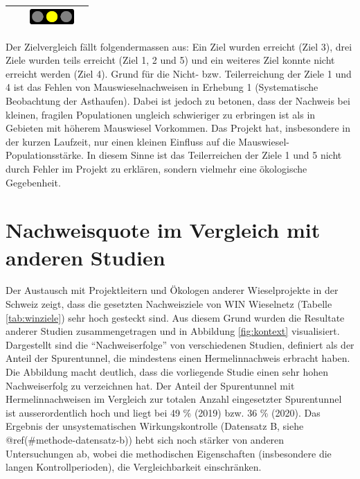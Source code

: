 \documentclass[
  oneside]{scrbook}
\begin{document}
\begin{table}
\begin{tabular}[t]{rp{65mm}>{}lp{60mm}}
\cellcolor{gray!6}{5} & \cellcolor{gray!6}{In jeder untersuchten Verbindungsachse sollen mindestens einmal pro Jahr Wiesel (mindestens Hermeline) nachgewiesen werden.} & \cellcolor{gray!6}{}\includegraphics[width=0.67in, height=0.24in]{images/ampel_gelb.png} & \cellcolor{gray!6}{Gemäss Datensatz A2 konnten auf 4 von 5 kontrollierten Korridoren Nachweise von Hermelin und Iltis gemacht werden}\\
\bottomrule
\end{tabular}
\end{table}

Der Zielvergleich fällt folgendermassen aus: Ein Ziel wurden erreicht (Ziel 3), drei Ziele wurden teils erreicht (Ziel 1, 2 und 5) und ein weiteres Ziel konnte nicht erreicht werden (Ziel 4). Grund für die Nicht- bzw. Teilerreichung der Ziele 1 und 4 ist das Fehlen von Mauswieselnachweisen in Erhebung 1 (Systematische Beobachtung der Asthaufen). Dabei ist jedoch zu betonen, dass der Nachweis bei kleinen, fragilen Populationen ungleich schwieriger zu erbringen ist als in Gebieten mit höherem Mauswiesel Vorkommen. Das Projekt hat, insbesondere in der kurzen Laufzeit, nur einen kleinen Einfluss auf die Mauswiesel-Populationsstärke. In diesem Sinne ist das Teilerreichen der Ziele 1 und 5 nicht durch Fehler im Projekt zu erklären, sondern vielmehr eine ökologische Gegebenheit.

\hypertarget{nachweisquote-im-vergleich-mit-anderen-studien}{%
\section{Nachweisquote im Vergleich mit anderen Studien}\label{nachweisquote-im-vergleich-mit-anderen-studien}}

Der Austausch mit Projektleitern und Ökologen anderer Wieselprojekte in der Schweiz zeigt, dass die gesetzten Nachweisziele von WIN Wieselnetz (Tabelle \ref{tab:winziele}) sehr hoch gesteckt sind. Aus diesem Grund wurden die Resultate anderer Studien zusammengetragen und in Abbildung \ref{fig:kontext} visualisiert. Dargestellt sind die ``Nachweiserfolge'' von verschiedenen Studien, definiert als der Anteil der Spurentunnel, die mindestens einen Hermelinnachweis erbracht haben. Die Abbildung macht deutlich, dass die vorliegende Studie einen sehr hohen Nachweiserfolg zu verzeichnen hat.
Der Anteil der Spurentunnel mit Hermelinnachweisen im Vergleich zur totalen Anzahl eingesetzter Spurentunnel ist ausserordentlich hoch und liegt bei 49 \% (2019) bzw. 36 \% (2020).
Das Ergebnis der unsystematischen Wirkungskontrolle (Datensatz B, siehe @ref(\#methode-datensatz-b)) hebt sich noch stärker von anderen Untersuchungen ab, wobei die methodischen Eigenschaften (insbesondere die langen Kontrollperioden), die Vergleichbarkeit einschränken.
\end{document}

